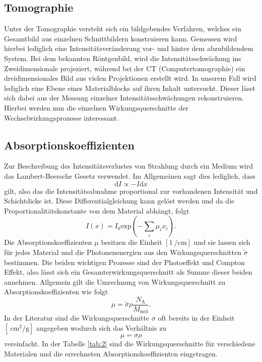 \subsection{Tomographie}
Unter der Tomographie versteht sich ein bildgebendes Verfahren, welches ein Gesamtbild aus einzelnen Schnittbildern konstruieren kann. Gemessen wird hierbei
lediglich eine Intensitätsveränderung vor- und hinter dem abzubildendem System. 
Bei dem bekannten Röntgenbild, wird die Intensitätsschwächung ins Zweidimensionale projeziert, während bei der CT (Computertomographie) ein dreidimensionales Bild aus vielen Projektionen erstellt wird. 
In unserem Fall wird lediglich eine Ebene eines Materialblocks auf ihren Inhalt untersucht. Dieser lässt sich dabei aus der Messung einzelner Intensitätsschwächungen rekonstruieren. 
Hierbei werden nun die einzelnen Wirkungsquerschnitte der Wechselwirkungsprozesse interessant.
\subsection{Absorptionskoeffizienten}
Zur Beschreibung des Intensitätsverlustes von Strahlung durch ein Medium wird das Lambert-Beersche Gesetz verwendet. Im Allgemeinen sagt dies lediglich, dass
\begin{equation*}
\text{d}I \propto -I \text{d}x
\end{equation*}
gilt, also das die Intensitätsabnahme proportional zur vorhandenen Intensität und Schichtdicke ist. Diese Differentialgleichung kann gelöst werden und da die Proportionalitätskonstante von dem Material abhängt, folgt
\begin{equation}
    \label{eqn:ayoo}
I(x) = I_0 \text{exp}\left(- \sum_{i}^{} \mu_i x_i \right).
\end{equation}
Die Absorptionskoeffizienten $\mu$ besitzen die Einheit $[\SI{1}{\per\centi\meter}]$ und sie lassen sich für jedes Material und die Photonenenergien aus den Wirkungsquerschnitten $\tilde{\sigma}$ bestimmen. Die beiden wichtigen Prozesse sind der Photoeffekt und Compton Effekt,
also lässt sich ein Gesamterwirkungsquerschnitt als Summe dieser beiden annehmen. Allgemein gilt die Umrechnung von Wirkungsquerschnitt zu Absorptionskoeffizienten wie folgt \cite{hier}
\begin{equation*}
\mu = \tilde{\sigma} \rho \frac{N_\text{A}}{M_{\text{mol}}}.
\end{equation*}
In der Literatur sind die Wirkungsquerschnitte $\sigma$ oft bereits in der Einheit $[\SI{}{\centi\meter\squared\per\gram}]$ angegeben wodurch sich das Verhältnis zu 
\begin{equation*}
\mu = \sigma \rho
\end{equation*}
vereinfacht. In der Tabelle \ref{tab:2} sind die Wirkungsquerschnitte für verschiedene Materialen \cite{wqs} und die errechneten Absorptionskoeffizienten eingetragen. 
